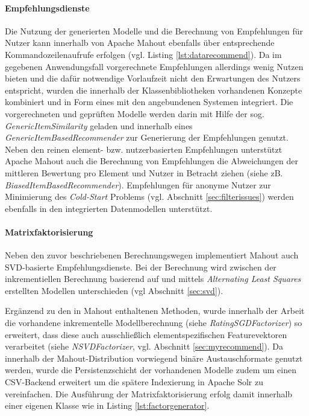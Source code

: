\paragraph{Empfehlungsdienste} Die Nutzung der generierten Modelle und die Berechnung von Empfehlungen für Nutzer kann innerhalb von Apache Mahout ebenfalls über entsprechende Kommandozeilenaufrufe erfolgen (vgl. Listing \ref{lst:datarecommend}). Da im gegebenen Anwendungsfall vorgerechnete Empfehlungen allerdings wenig Nutzen bieten und die dafür notwendige Vorlaufzeit nicht den Erwartungen des Nutzers entspricht, wurden die innerhalb der Klassenbibliotheken vorhandenen Konzepte kombiniert und in Form eines  mit den angebundenen Systemen integriert. Die vorgerechneten und geprüften Modelle werden darin mit Hilfe der sog. \textit{GenericItemSimilarity} geladen und innerhalb eines \textit{GenericItemBasedRecommender} zur Generierung der Empfehlungen genutzt. Neben den reinen element- bzw. nutzerbasierten Empfehlungen unterstützt Apache Mahout auch die Berechnung von Empfehlungen die Abweichungen der mittleren Bewertung pro Element und Nutzer in Betracht ziehen (siehe zB. \textit{BiasedItemBasedRecommender}). Empfehlungen für anonyme Nutzer zur Minimierung des \textit{Cold-Start} Problems (vgl. Abschnitt \ref{sec:filterissues}) werden ebenfalls in den integrierten Datenmodellen unterstützt. 

 

\paragraph{Matrixfaktorisierung} Neben den zuvor beschriebenen Berechnungswegen implementiert Mahout auch \acs{SVD}-basierte Empfehlungsdienste. Bei der Berechnung wird zwischen der inkrementiellen Berechnung basierend auf \citep{funk2006}  und mittels \textit{Alternating Least Squares} \citep{Bell:2007:SCF:1441428.1442050,zhou08} erstellten Modellen unterschieden (vgl Abschnitt \ref{sec:svd}).



Ergänzend zu den in Mahout enthaltenen Methoden, wurde innerhalb der Arbeit die vorhandene inkrementelle Modellberechnung (siehe \textit{RatingSGDFactorizer}) so erweitert, dass diese auch ausschließlich elementspezifischen Featurevektoren verarbeitet (siehe \textit{NSVDFactorizer}, vgl. Abschnitt \ref{sec:myrecommend}). Da innerhalb der Mahout-Distribution vorwiegend binäre Austauschformate genutzt werden, wurde die Persistenzschicht der vorhandenen Modelle zudem um einen CSV-Backend erweitert um die spätere Indexierung in Apache Solr zu vereinfachen. Die Ausführung der Matrixfaktorisierung erfolg damit innerhalb einer eigenen Klasse wie in Listing \ref{lst:factorgenerator}.

